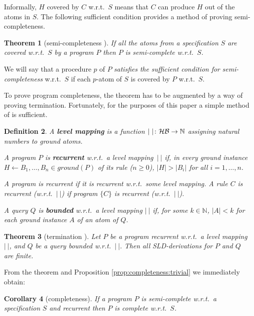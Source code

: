 \documentclass{tlp}
\newtheorem{theorem}{Theorem}
\newtheorem{corollary}[theorem]{Corollary}
\newtheorem{definition}[theorem]{Definition}
\newcommand*{\seq}[2][n]  {{#2_{1}, \allowbreak \ldots, \allowbreak #2_{#1}}}
\newcommand*{\HB}{{\ensuremath{\cal{H B}}}\xspace}
\newcommand*{\NN}{{\ensuremath{\mathbb{N}}}\xspace}
\begin{document}
Informally, $H$ covered by $C$ w.r.t.\ $S$ means that $C$ can produce $H$ out
of the atoms in $S$.
The following sufficient condition provides a method of proving
semi-completeness. 

\begin{theorem}[semi-completeness {\rm\cite{drabent.tocl16}}]
\label{th:semi-complete}
If all the atoms from a specification $S$ are covered w.r.t.~$S$
 by a program $P$ 
then $P$ is semi-complete w.r.t.~$S$.
\end{theorem}

We will say that a procedure $p$ of $P$
{\em satisfies the sufficient condition for semi-completeness} w.r.t.\ $S$
if each $p$-atom of $S$ is covered by $P$ w.r.t.\ $S$.

To prove program completeness, the theorem has to be augmented by a way of
proving termination.  Fortunately, for the purposes of this paper 
a simple method of \cite{DBLP:journals/jlp/Bezem93} is sufficient.

\begin{definition}
A {\bf level mapping} is a
function $|\ |\colon \HB\to \NN$ assigning natural numbers to ground atoms.

A program $P$ is  {\bf recurrent} {w.r.t.\ a level mapping}~$|\ |$
\cite{DBLP:journals/jlp/Bezem93,Apt-Prolog} if, in
every ground instance  $H\gets\seq B\in ground(P)$ of its rule ($n\geq0$),
$|H|>|B_i|$ for all $i=1,\ldots,n$.

A program is {recurrent}
if it is recurrent w.r.t.\ some level mapping.   
A rule $C$ is {recurrent} (w.r.t.\ $|\ |$) if program $\{C\}$
is {recurrent} (w.r.t.\ $|\ |$).


A query $Q$ is {\bf bounded} w.r.t.\ a level mapping  $|\ |$ if, 
for some $k\in\NN$, $|A|<k$ for each ground instance $A$ of an atom of $Q$.
\end{definition}
\vspace{-4pt}
\begin{theorem}
[termination {\rm\cite{DBLP:journals/jlp/Bezem93}}]
\label{th:termination}
Let $P$ be a program recurrent w.r.t.\ a level mapping $|\ |$,
and $Q$ be a query bounded w.r.t.\ $|\ |$.
Then all SLD-derivations for $P$ and $Q$ are finite.
\end{theorem}




From the theorem and Proposition \ref{prop:completeness:trivial} we
immediately obtain: 
\begin{corollary}
[completeness]
\label{cor:completeness:recurrent}
If a program $P$ is semi-complete w.r.t.\ a specification $S$ and
recurrent
then $P$ is complete w.r.t.~$S$.
\end{corollary}
\end{document}
